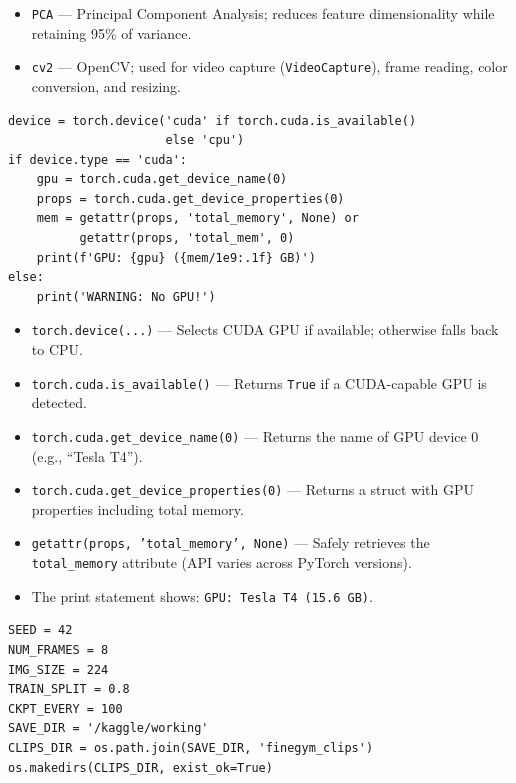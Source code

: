 \begin{explanation}
\begin{itemize}[nosep]
  \item \texttt{PCA} --- Principal Component Analysis; reduces feature dimensionality while retaining 95\% of variance.
  \item \texttt{cv2} --- OpenCV; used for video capture (\texttt{VideoCapture}), frame reading, color conversion, and resizing.
\end{itemize}
\end{explanation}

\begin{lstlisting}
device = torch.device('cuda' if torch.cuda.is_available()
                      else 'cpu')
if device.type == 'cuda':
    gpu = torch.cuda.get_device_name(0)
    props = torch.cuda.get_device_properties(0)
    mem = getattr(props, 'total_memory', None) or
          getattr(props, 'total_mem', 0)
    print(f'GPU: {gpu} ({mem/1e9:.1f} GB)')
else:
    print('WARNING: No GPU!')
\end{lstlisting}

\begin{explanation}
\begin{itemize}[nosep]
  \item \texttt{torch.device(...)} --- Selects CUDA GPU if available; otherwise falls back to CPU.
  \item \texttt{torch.cuda.is\_available()} --- Returns \texttt{True} if a CUDA-capable GPU is detected.
  \item \texttt{torch.cuda.get\_device\_name(0)} --- Returns the name of GPU device 0 (e.g., ``Tesla T4'').
  \item \texttt{torch.cuda.get\_device\_properties(0)} --- Returns a struct with GPU properties including total memory.
  \item \texttt{getattr(props, 'total\_memory', None)} --- Safely retrieves the \texttt{total\_memory} attribute (API varies across PyTorch versions).
  \item The print statement shows: \texttt{GPU: Tesla T4 (15.6 GB)}.
\end{itemize}
\end{explanation}

\begin{lstlisting}
SEED = 42
NUM_FRAMES = 8
IMG_SIZE = 224
TRAIN_SPLIT = 0.8
CKPT_EVERY = 100
SAVE_DIR = '/kaggle/working'
CLIPS_DIR = os.path.join(SAVE_DIR, 'finegym_clips')
os.makedirs(CLIPS_DIR, exist_ok=True)
\end{lstlisting}

